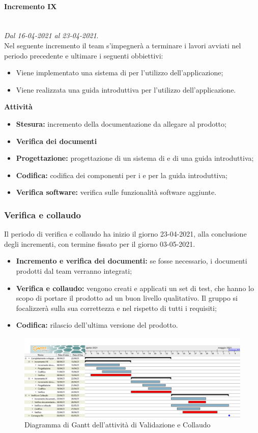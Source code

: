 \paragraph{Incremento IX}\textit{}\\
\textit{Dal 16-04-2021 al 23-04-2021}. \\ 
Nel seguente incremento il team s'impegnerà a terminare i lavori avviati nel periodo precedente e ultimare i seguenti obbiettivi:
\begin{itemize}
	\item Viene implementato una sistema di  per l'utilizzo dell'applicazione;
	\item Viene realizzata una guida introduttiva per l'utilizzo dell'applicazione.
\end{itemize}			
\textbf{Attività}			
\begin{itemize}
\item \textbf{Stesura:} incremento della documentazione da allegare al prodotto;
\item \textbf{Verifica dei documenti} 
\item \textbf{Progettazione:} progettazione di un sistema di  e di una guida introduttiva;
\item \textbf{Codifica:} codifica dei componenti per i  e per la guida introduttiva;
\item \textbf{Verifica software:} verifica sulle funzionalità software aggiunte.
\end{itemize}
\subsubsection{Verifica e collaudo}
Il periodo di verifica e collaudo ha inizio il giorno 23-04-2021, alla conclusione degli incrementi, con termine fissato per il giorno 03-05-2021.
\begin{itemize}
	\item \textbf{Incremento e verifica dei documenti:} se fosse necessario, i documenti prodotti dal team verranno integrati;
	\item \textbf{Verifica e collaudo:} vengono creati e applicati un set di test, che hanno lo scopo di portare il prodotto ad un buon livello qualitativo. Il gruppo si focalizzerà sulla sua correttezza e nel rispetto di tutti i requisiti;
	\item \textbf{Codifica:} rilascio dell'ultima versione del prodotto.
\end{itemize}

\begin{landscape}
\begin{figure}[h]
	\centering
	\includegraphics[width=\linewidth]{Images/GanttPianificazioneValidazioneCollaudo.PNG}
	\caption{Diagramma di Gantt dell'attività di Validazione e Collaudo}
\end{figure}
\end{landscape}



